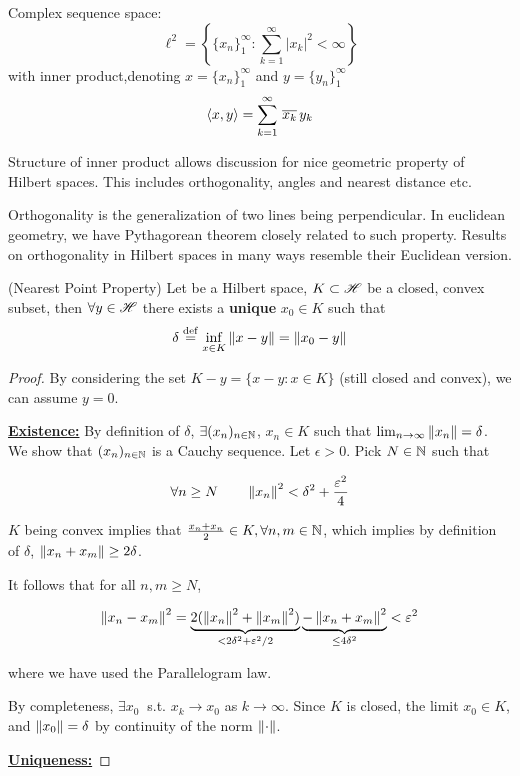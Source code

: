 \documentclass{article}
\begin{document}
\begin{example}\rm\nextline
	Complex sequence space:
	$$\ell^2=
		\left\{\{x_n\}_1^\infty:\sum_{k=1}^\infty |x_k|^2<\infty \right\}$$
	with  inner product,denoting $x=\{x_n\}_1^\infty$ and $y=\{y_n\}_1^\infty$
	$$
		\left<{x},{y}\right>=\sum_{k=1}^\infty \,{\overline{x_k}\, y_k}
	$$
\end{example}

\begin{unexaminable}
Structure of inner product allows discussion for nice geometric property of Hilbert spaces. This includes orthogonality, angles and nearest distance etc.
\end{unexaminable}
\begin{unexaminable}
Orthogonality is the generalization of two lines being perpendicular. In euclidean geometry, we have Pythagorean theorem closely related to such property. Results on orthogonality in Hilbert spaces in many ways resemble their Euclidean version.
\end{unexaminable}

\begin{proposition}
(Nearest Point Property)
	Let \hbs be a Hilbert space, $K\subset \mathscr{H}$ be a closed, convex subset, then $\forall y \in \mathscr{H}$ there exists a {\bf{unique}} $x_0\in K$ such that
	$$
		\delta \overset{\rm{def}}{=} \inf_{x\in K} \left\|{x-y}\right\| = \left\|{x_0-y}\right\|
	$$
\end{proposition}

\begin{proof} 
By considering the set $K-y = \{x-y: x\in K\}$ (still closed and convex), we can assume $y=0$.  

\underline{\textbf{Existence:}}
By definition of $\delta$, $\exists (x_n)_{n \in \mathbb{N}}$, $x_n\in K$ such that $\lim_{n \to \infty} \left\|{x_n}\right\|=\delta$. We show that $(x_n)_{n \in \mathbb{N}}$ is a Cauchy sequence. Let $\epsilon >0$. Pick $N \in \mathbb{N}$ such that  

$$
\forall n \geq N \qquad \left\|{x_n}\right\|^2 < \delta^2 + \frac{\varepsilon^2}{4}
$$  

$K$ being convex implies that $\frac{x_n+x_n}{2} \in K, \forall n,m \in \mathbb{N}$, which implies by definition of $\delta$, $\left\|{x_n+x_m}\right\| \geq 2\delta$.  

It follows that for all $n,m \geq N$,  

\begin{equation*}
    \left\|{x_n-x_m}\right\|^2 = \underbrace{2(\left\|{x_n}\right\|^2+\left\|{x_m}\right\|^2)}_{< 2\delta^2 + \varepsilon^2 /2} \underbrace{-\left\|{x_n+x_m}\right\|^2}_{\leq 4\delta^2} < \varepsilon^2
\end{equation*}  

where we have used the Parallelogram law.  

By completeness, $\exists x_0 \ $ s.t. $x_k \to x_0$ as $k \to \infty$. Since $K$ is closed, the limit $x_0\in K$, and $\left\|{x_0}\right\|=\delta$ by continuity of the norm $\left\|{\cdot}\right\|$.  

\underline{\textbf{Uniqueness:}}
\end{proof}  
\end{document}
